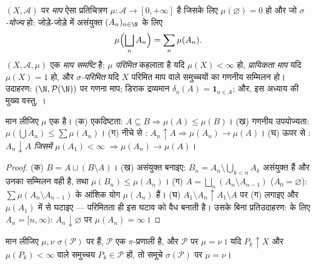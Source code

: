 \begin{definition}\label{def:b3:measure:measure}
$(X, \mathcal A)$ पर \emph{माप} ऐसा प्रतिचित्रण $\mu \colon \mathcal A \to [0, +\infty]$ है जिसके लिए
$\mu(\varnothing)
= 0$ हो और जो \emph{$\sigma$-योज्य} हो: जोड़े-जोड़े में असंयुक्त
$(A_n)_{n\in\N}$ के लिए
\[
\mu\Bigl(\bigsqcup_n A_n\Bigr) = \sum_n \mu(A_n).
\]
$(X, \mathcal A, \mu)$ एक \emph{माप समष्टि} है; $\mu$ \emph{परिमित} कहलाता है यदि
$\mu(X) < \infty$ हो, \emph{प्रायिकता माप} यदि $\mu(X) = 1$ हो, और \emph{$\sigma$-परिमित}
यदि $X$ परिमित माप वाले समुच्चयों का गणनीय सम्मिलन हो। उदाहरण:
$(\N, \mathcal P(\N))$ पर गणना माप; डिराक द्रव्यमान $\delta_a(A)
= \mathbf 1_{a \in A}$; और, इस अध्याय की मुख्य
वस्तु, ।
\end{definition}

\begin{proposition}\label{prop:b3:measure:basics}
मान लीजिए $\mu$ एक  है। (क) एकदिष्टता: $A \subseteq B
\Rightarrow \mu(A) \leq \mu(B)$। (ख) गणनीय
उपयोज्यता: $\mu(\bigcup A_n) \leq \sum\mu(A_n)$। (ग) नीचे से : $A_n \uparrow A \Rightarrow \mu(A_n) \to \mu(A)$। (घ) ऊपर से :
$A_n \downarrow A$ \emph{जिसमें $\mu(A_1) < \infty$} $\Rightarrow \mu(A_n) \to \mu(A)$।
\end{proposition}

\begin{proof}
(क) $B = A \sqcup (B\setminus A)$। (ख) असंयुक्त बनाइए: $B_n = A_n
\setminus \bigcup_{k<n}A_k$ असंयुक्त हैं और उनका
सम्मिलन वही है, तथा $\mu(B_n) \leq \mu(A_n)$। (ग) $A = \bigsqcup_n (A_n
\setminus A_{n-1})$ ($A_0 = \varnothing$): $\sum\mu(A_n\setminus A_{n-1})$ के आंशिक
योग $\mu(A_n)$ हैं। (घ) $A_1 \setminus A_n \uparrow A_1 \setminus A$ पर (ग) लगाइए और $\mu(A_1)$ में से घटाइए ---
परिमितता ही इस घटाव को वैध बनाती है। उसके बिना प्रतिउदाहरण:  के लिए $A_n = [n, \infty)$: $A_n \downarrow \varnothing$ पर $\mu(A_n) =
\infty$।
\end{proof}

\begin{theorem}[अद्वितीयता]\label{thm:b3:measure:uniqueness}
मान लीजिए $\mu, \nu$ $\sigma(\mathcal P)$ पर  हैं, $\mathcal
P$ एक $\pi$-प्रणाली है,
और $\mathcal P$ पर $\mu = \nu$। यदि $P_k \uparrow X$ और $\mu(P_k) < \infty$ वाले समुच्चय $P_k \in \mathcal P$ हों,
तो समूचे $\sigma(\mathcal P)$ पर $\mu = \nu$।
\end{theorem}


